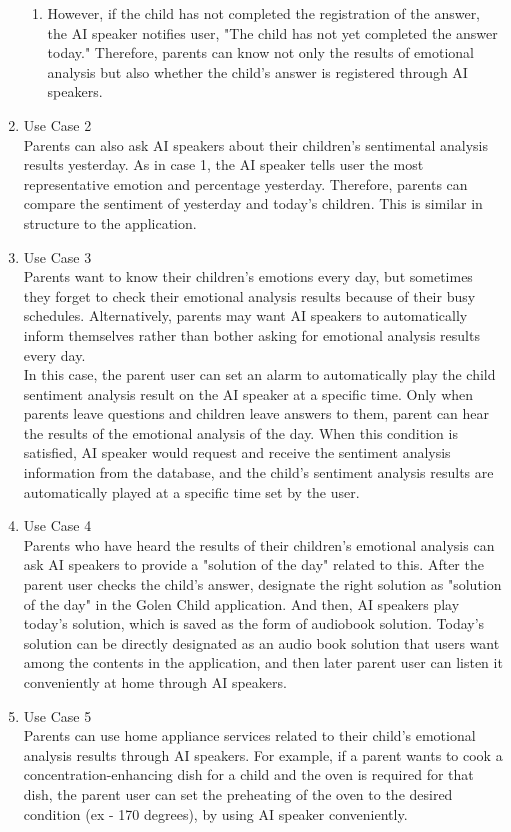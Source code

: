 \documentclass[conference]{IEEEtran}
\begin{document}
\begin{enumerate}
\begin{enumerate}
        \item However, if the child has not completed the registration of the answer, the AI speaker notifies user, "The child has not yet completed the answer today." Therefore, parents can know not only the results of emotional analysis but also whether the child's answer is registered through AI speakers.\newline
    \end{enumerate}
    \item Use Case 2
    \\Parents can also ask AI speakers about their children's sentimental analysis results yesterday. As in case 1, the AI speaker tells user the most representative emotion and percentage yesterday. Therefore, parents can compare the sentiment of yesterday and today's children. This is similar in structure to the application.
    \newline
    \item Use Case 3
    \\Parents want to know their children's emotions every day, but sometimes they forget to check their emotional analysis results because of their busy schedules. Alternatively, parents may want AI speakers to automatically inform themselves rather than bother asking for emotional analysis results every day.
    \\In this case, the parent user can set an alarm to automatically play the child sentiment analysis result on the AI speaker at a specific time. Only when parents leave questions and children leave answers to them, parent can hear the results of the emotional analysis of the day. When this condition is satisfied, AI speaker would request and receive the sentiment analysis information from the database, and the child's sentiment analysis results are automatically played at a specific time set by the user.
    \newline
    \item Use Case 4
    \\Parents who have heard the results of their children's emotional analysis can ask AI speakers to provide a "solution of the day" related to this. After the parent user checks the child's answer, designate the right solution as "solution of the day" in the Golen Child application. And then, AI speakers play today's solution, which is saved as the form of audiobook solution. Today's solution can be directly designated as an audio book solution that users want among the contents in the application, and then later parent user can listen it conveniently at home through AI speakers.
    \newline
    \item Use Case 5 
    \\Parents can use home appliance services related to their child's emotional analysis results through AI speakers. For example, if a parent wants to cook a concentration-enhancing dish for a child and the oven is required for that dish, the parent user can set the preheating of the oven to the desired condition (ex - 170 degrees), by using AI speaker conveniently.
    \newline
\end{enumerate}
\newpage
\end{document}
